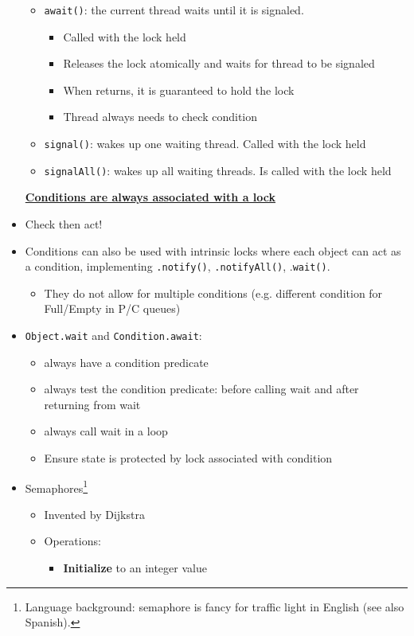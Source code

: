 \documentclass[a4paper]{article}
\newcommand{\inline}[1]{\lstinline!#1!}%
\begin{document}
\begin{itemize}
\begin{itemize}
\item \inline{await()}: the current thread waits until it is signaled. 
\begin{itemize}
\item Called with the lock held
\item Releases the lock atomically and waits for thread to be signaled
\item When returns, it is guaranteed to hold the lock
\item Thread always needs to check condition
\end{itemize}
\item \inline{signal()}: wakes up one waiting thread. Called with the lock held
\item \inline{signalAll()}: wakes up all waiting threads. Is called with the lock held
\end{itemize}
\textbf{\underline{Conditions are always associated with a lock}}
\item Check then act! 
\item Conditions can also be used with intrinsic locks where each object can act as a condition, implementing \inline{.notify()}, \inline{.notifyAll()}, .\inline{wait()}. 
\begin{itemize}
\item They do not allow for multiple conditions (e.g. different condition for Full/Empty in P/C queues)
\end{itemize}
\item \inline{Object.wait} and \inline{Condition.await}: 
\begin{itemize}
\item always have a condition predicate
\item always test the condition predicate: before calling wait and after returning from wait 
\item always call wait in a loop
\item Ensure state is protected by lock associated with condition
\end{itemize}
\item Semaphores\footnote{Language background: semaphore is fancy for traffic light in English (see also Spanish).} 
\begin{itemize}
\item Invented by Dijkstra
\item Operations:
\begin{itemize}
\item \textbf{Initialize} to an integer value

\end{itemize}
\end{itemize}
\end{itemize}
\end{document}

